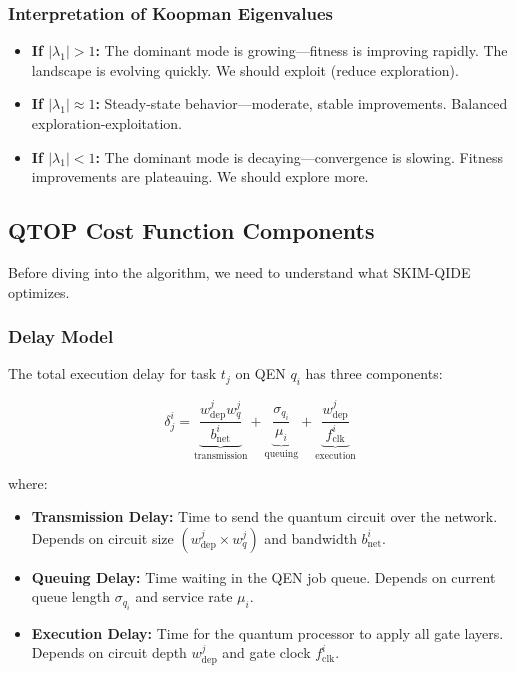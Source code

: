 \documentclass[12pt,a4paper]{article}
\begin{document}
\subsubsection{Interpretation of Koopman Eigenvalues}

\begin{itemize}
  \item \textbf{If $|\lambda_1| > 1$:} The dominant mode is growing---fitness is improving rapidly. The landscape is evolving quickly. We should exploit (reduce exploration).
  \item \textbf{If $|\lambda_1| \approx 1$:} Steady-state behavior---moderate, stable improvements. Balanced exploration-exploitation.
  \item \textbf{If $|\lambda_1| < 1$:} The dominant mode is decaying---convergence is slowing. Fitness improvements are plateauing. We should explore more.
\end{itemize}

\subsection{QTOP Cost Function Components}

Before diving into the algorithm, we need to understand what SKIM-QIDE optimizes.

\subsubsection{Delay Model}

The total execution delay for task $t_j$ on QEN $q_i$ has three components:

\begin{equation}
\delta^i_j = \underbrace{\frac{w^j_{\text{dep}} w^j_q}{b^i_{\text{net}}}}_{\text{transmission}} + \underbrace{\frac{\sigma_{q_i}}{\mu_i}}_{\text{queuing}} + \underbrace{\frac{w^j_{\text{dep}}}{f^i_{\text{clk}}}}_{\text{execution}}
\end{equation}

where:
\begin{itemize}
  \item \textbf{Transmission Delay:} Time to send the quantum circuit over the network. Depends on circuit size $(w^j_{\text{dep}} \times w^j_q)$ and bandwidth $b^i_{\text{net}}$.
  \item \textbf{Queuing Delay:} Time waiting in the QEN job queue. Depends on current queue length $\sigma_{q_i}$ and service rate $\mu_i$.
  \item \textbf{Execution Delay:} Time for the quantum processor to apply all gate layers. Depends on circuit depth $w^j_{\text{dep}}$ and gate clock $f^i_{\text{clk}}$.
\end{itemize}
\end{document}
